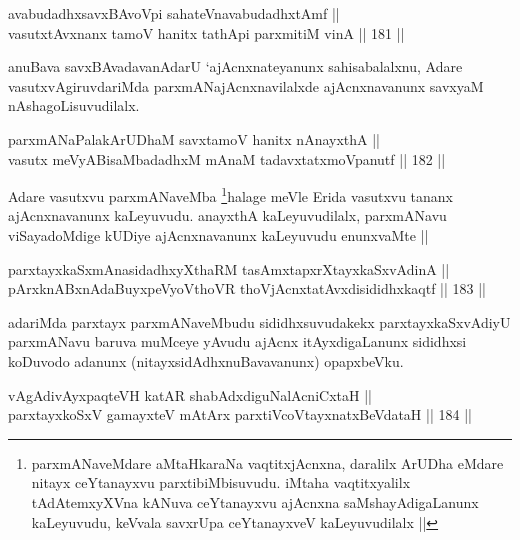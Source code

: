 
\begin{shl}
avabudadhxsavxBAvoV\s pi sahateV\s navabudadhxtAmf || \\
vasutxtAvxnanx tamoV hanitx tathA\s pi parxmitiM vinA ||  181 ||  
\end{shl}

\begin{artha}
anuBava savxBAvadavanAdarU `ajAcnxnateyanunx sahisabalalxnu, Adare vasutxvAgiruvdariMda parxmANajAcnxnavilalxde ajAcnxnavanunx savxyaM nAshagoLisuvudilalx.
\end{artha}

\begin{shl}
parxmANaPalakArUDhaM savxtamoV hanitx nAnayxthA || \\
vasutx meVyABisaMbadadhxM mAnaM tadavxtatxmoVpanutf ||  182 ||  
\end{shl}

\begin{artha}
Adare vasutxvu parxmANaveMba \footnote{parxmANaveMdare aMtaHkaraNa vaqtitxjAcnxna, daralilx ArUDha eMdare nitayx ceYtanayxvu parxtibiMbisuvudu. iMtaha vaqtitxyalilx tAdAtemxyXVna kANuva ceYtanayxvu ajAcnxna saMshayAdigaLanunx kaLeyuvudu, keVvala savxrUpa ceYtanayxveV kaLeyuvudilalx ||}halage meVle Erida vasutxvu tananx ajAcnxnavanunx kaLeyuvudu. anayxthA kaLeyuvudilalx, parxmANavu viSayadoMdige kUDiye ajAcnxnavanunx kaLeyuvudu enunxvaMte ||
\end{artha}

\begin{shl}
parxtayxkaSxmAnasidadhxyXthaRM tasAmxtapxrXtayxkaSxvAdinA || \\
pArxknABxnAdaBuyxpeVyoV\s thoVR thoV\s jAcnxtatAvxdisididhxkaqtf ||  183 ||  
\end{shl}

\begin{artha}
adariMda parxtayx parxmANaveMbudu sididhxsuvudakekx parxtayxkaSxvAdiyU parxmANavu baruva muMceye yAvudu ajAcnx itAyxdigaLanunx sididhxsi koDuvodo adanunx (nitayxsidAdhxnuBavavanunx) opapxbeVku.
\end{artha}


\begin{shl}
vAgAdivAyxpaqteVH katAR shabAdxdiguNalAcniCxtaH || \\
parxtayxkoSxV gamayxteV mAtArx parxtiVcoV\s tayxnatxBeVdataH ||  184 ||  
\end{shl}

